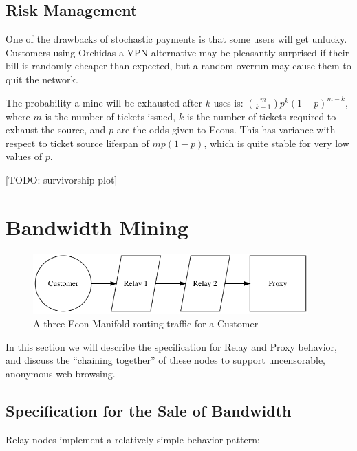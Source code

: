 \documentclass{article}
\newcommand{\orchid}{Orchid}
\newcommand{\Orchid}{\orchid}
\begin{document}
\subsection{Risk Management}

One of the drawbacks of stochastic payments is that some users will
get unlucky. Customers using \Orchid as a VPN alternative may be
pleasantly surprised if their bill is randomly cheaper than expected,
but a random overrun may cause them to quit the network.

The probability a mine will be exhausted after $k$ uses is:
$\binom{m}{k-1} p^{k} (1-p)^{m-k}$, where $m$ is the number of tickets
issued, $k$ is the number of tickets required to exhaust the source,
and $p$ are the odds given to Econs. This has variance with respect to
ticket source lifespan of $m p (1-p)$, which is quite stable for very
low values of $p$.

[TODO: survivorship plot]

\section{Bandwidth Mining}
\label{sec:mining}

\begin{figure}[htbp]
  \centering
  \includegraphics[width = 300pt]{sttc}
  \caption{A three-Econ Manifold routing traffic for a Customer}
\end{figure}

In this section we will describe the specification for Relay and Proxy
behavior, and discuss the ``chaining together'' of these nodes to
support uncensorable, anonymous web browsing.

\subsection{Specification for the Sale of Bandwidth}

Relay nodes implement a relatively simple behavior pattern:
\end{document}
